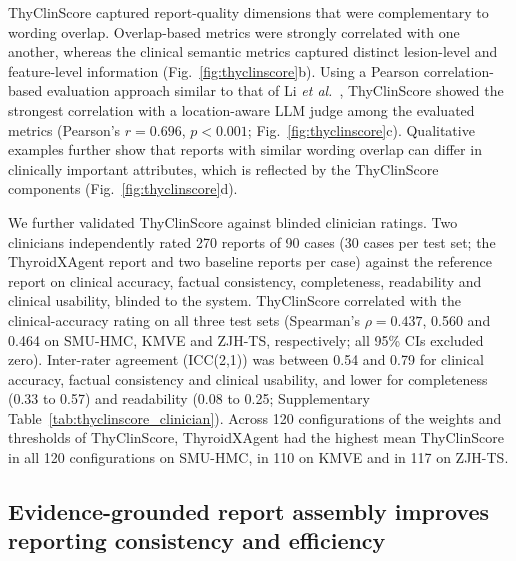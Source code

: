 \documentclass[fleqn,10pt]{wlscirep}
\begin{document}
ThyClinScore captured report-quality dimensions that were complementary to wording overlap. Overlap-based metrics were strongly correlated with one another, whereas the clinical semantic metrics captured distinct lesion-level and feature-level information (Fig.~\ref{fig:thyclinscore}b). Using a Pearson correlation-based evaluation approach similar to that of Li \textit{et al.}~\cite{li_towards_2025}, ThyClinScore showed the strongest correlation with a location-aware LLM judge among the evaluated metrics (Pearson's \(r=0.696\), \(p<0.001\); Fig.~\ref{fig:thyclinscore}c). Qualitative examples further show that reports with similar wording overlap can differ in clinically important attributes, which is reflected by the ThyClinScore components (Fig.~\ref{fig:thyclinscore}d).

We further validated ThyClinScore against blinded clinician ratings. Two clinicians independently rated 270 reports of 90 cases (30 cases per test set; the ThyroidXAgent report and two baseline reports per case) against the reference report on clinical accuracy, factual consistency, completeness, readability and clinical usability, blinded to the system. ThyClinScore correlated with the clinical-accuracy rating on all three test sets (Spearman's \(\rho=0.437\), 0.560 and 0.464 on SMU-HMC, KMVE and ZJH-TS, respectively; all 95\% CIs excluded zero). Inter-rater agreement (ICC(2,1)) was between 0.54 and 0.79 for clinical accuracy, factual consistency and clinical usability, and lower for completeness (0.33 to 0.57) and readability (0.08 to 0.25; Supplementary Table~\ref{tab:thyclinscore_clinician}). Across 120 configurations of the weights and thresholds of ThyClinScore, ThyroidXAgent had the highest mean ThyClinScore in all 120 configurations on SMU-HMC, in 110 on KMVE and in 117 on ZJH-TS.


\subsection{Evidence-grounded report assembly improves reporting consistency and efficiency}
\end{document}

